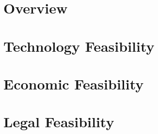 
\newcommand*{\feas}{chapters/feasibility/}
\section{Overview}
	
\section{Technology Feasibility}
	
\section{Economic Feasibility}
	
\section{Legal Feasibility}
	